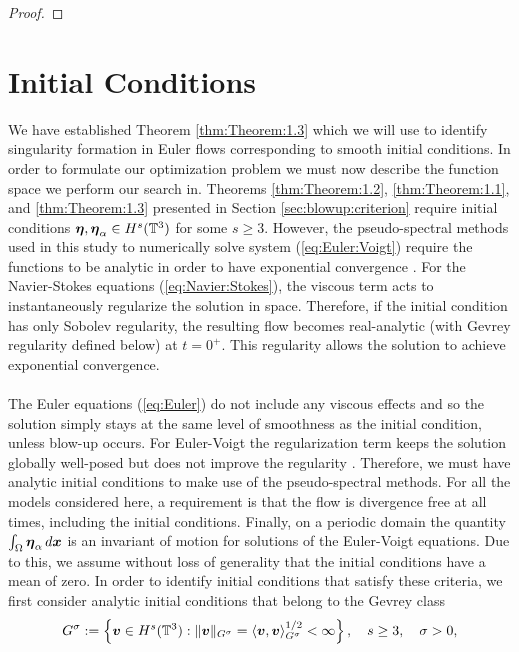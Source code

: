 \begin{proof}
\end{proof}


\section{Initial Conditions}\label{sec:initial:conditions}

We have established Theorem \ref{thm:Theorem:1.3} which we will use to identify singularity formation in Euler flows corresponding to smooth initial conditions. In order to formulate our optimization problem we must now describe the function space we perform our search in. Theorems \ref{thm:Theorem:1.2}, \ref{thm:Theorem:1.1}, and \ref{thm:Theorem:1.3} presented in Section \ref{sec:blowup:criterion} require initial conditions ${\boldsymbol \eta},{\boldsymbol \eta_\alpha} \in H^s(\mathbb{T}^3)$ for some $s\geq 3$. However, the pseudo-spectral methods used in this study to numerically solve system (\ref{eq:Euler:Voigt}) require the functions to be analytic in order to have exponential convergence \cite{canuto_spectral_2006}. For the Navier-Stokes equations (\ref{eq:Navier:Stokes}), the viscous term acts to instantaneously regularize the solution in space. Therefore, if the initial condition has only Sobolev regularity, the resulting flow becomes real-analytic (with Gevrey regularity defined below) at $t=0^+$. This regularity allows the solution to achieve exponential convergence.
\\~\\
The Euler equations (\ref{eq:Euler}) do not include any viscous effects and so the solution simply stays at the same level of smoothness as the initial condition, unless blow-up occurs. For Euler-Voigt the regularization term keeps the solution globally well-posed but does not improve the regularity \cite{larios_higher-order_2010}. Therefore, we must have analytic initial conditions to make use of the pseudo-spectral methods. For all the models considered here, a requirement is that the flow is divergence free at all times, including the initial conditions. Finally, on a periodic domain the quantity $\int_\Omega {\boldsymbol \eta_\alpha} \,d\boldsymbol x$ is an invariant of motion for solutions of the Euler-Voigt equations. Due to this, we assume without loss of generality that the initial conditions have a mean of zero. In order to identify initial conditions that satisfy these criteria, we first consider analytic initial conditions that belong to the Gevrey class
\begin{equation}\label{eq:Gevrey:Class}
G^\sigma := \left\lbrace \boldsymbol v\in H^s(\mathbb{T}^3) : \|\boldsymbol v\|_{G^\sigma} = \left\langle \boldsymbol v,\boldsymbol v\right\rangle_{G^\sigma}^{1/2}<\infty \right\rbrace, \quad s\geq 3, \quad \sigma > 0,
\end{equation}

